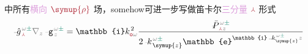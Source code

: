  中所有\textcolor{Plum}{横向} $\textcolor{Maroon}{\symup{\rho}}$ 场，somehow可进一步写做笛卡尔\textcolor{Plum}{三分量} $\textcolor{Maroon}{\Yup}$ 形式
\begin{subequations} \label{eq:simplify8-scalar}
\begin{align}
	\Xint{{}^{}_{\mathcolor{gray}{-}}}{10}{\hat{g}}^{\;\!\mathcolor{gray}{\omega} \textcolor{PineGreen}{\pm}}_{\;\! \textcolor{Maroon}{\Yup}} \mathcolor{gray}{\nabla_z} \Xint{\begin{smallmatrix} ~ \\ {}^{}_{\mathcolor{gray}{-}} \\ ~ \end{smallmatrix}}{09}{\mathtt{g}}^{\;\!\mathcolor{gray}{\omega} \textcolor{PineGreen}{\pm}}_{\;\! \mathcolor{gray}{z}} &= \mathbb{i} k_{\textcolor{Maroon}{\mathsf{o}} \mathcolor{gray}{\omega}}^{\;\! 2} \frac{\Xint{\mathcolor{gray}{-}}{25}{\bar{P}}^{\;\! \mathcolor{gray}{\omega} \textcolor{PineGreen}{\pm}}_{\;\! \textcolor{Maroon}{\Yup} \mathcolor{gray}{z}}}{2 \Xint{\begin{smallmatrix} ~ \\ {}^{}_{\mathcolor{gray}{-}} \\ ~ \end{smallmatrix}}{15}{k}_{\;\! \symup{z}}^{\;\! \mathcolor{gray}{\omega} \textcolor{PineGreen}{\pm}} \mathbb{e}^{\mathbb{i} \Xint{\begin{smallmatrix} ~ \\ {}^{}_{\mathcolor{gray}{-}} \\ ~ \end{smallmatrix}}{15}{k}_{\symup{z}}^{\;\! \mathcolor{gray}{\omega} \textcolor{PineGreen}{\pm}} \mathcolor{gray}{z}}} \label{eq:simplify8-scalar-g} \\

\end{align}
\end{subequations}
